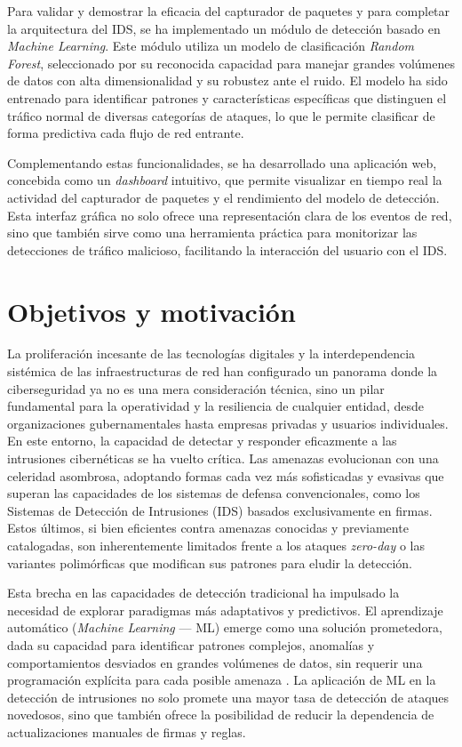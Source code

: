 Para validar y demostrar la eficacia del capturador de paquetes y para completar la arquitectura del IDS, se ha implementado un módulo de detección basado en \textit{Machine Learning}. Este módulo utiliza un modelo de clasificación \textit{Random Forest}, seleccionado por su reconocida capacidad para manejar grandes volúmenes de datos con alta dimensionalidad y su robustez ante el ruido. El modelo ha sido entrenado para identificar patrones y características específicas que distinguen el tráfico normal de diversas categorías de ataques, lo que le permite clasificar de forma predictiva cada flujo de red entrante.

Complementando estas funcionalidades, se ha desarrollado una aplicación web, concebida como un \textit{dashboard} intuitivo, que permite visualizar en tiempo real la actividad del capturador de paquetes y el rendimiento del modelo de detección. Esta interfaz gráfica no solo ofrece una representación clara de los eventos de red, sino que también sirve como una herramienta práctica para monitorizar las detecciones de tráfico malicioso, facilitando la interacción del usuario con el IDS.

\section{Objetivos y motivación}\label{sec:objetivos}

La proliferación incesante de las tecnologías digitales y la interdependencia sistémica de las infraestructuras de red han configurado un panorama donde la ciberseguridad ya no es una mera consideración técnica, sino un pilar fundamental para la operatividad y la resiliencia de cualquier entidad, desde organizaciones gubernamentales hasta empresas privadas y usuarios individuales. En este entorno, la capacidad de detectar y responder eficazmente a las intrusiones cibernéticas se ha vuelto crítica. Las amenazas evolucionan con una celeridad asombrosa, adoptando formas cada vez más sofisticadas y evasivas que superan las capacidades de los sistemas de defensa convencionales, como los Sistemas de Detección de Intrusiones (IDS) basados exclusivamente en firmas. Estos últimos, si bien eficientes contra amenazas conocidas y previamente catalogadas, son inherentemente limitados frente a los ataques \textit{zero-day} o las variantes polimórficas que modifican sus patrones para eludir la detección.

Esta brecha en las capacidades de detección tradicional ha impulsado la necesidad de explorar paradigmas más adaptativos y predictivos. El aprendizaje automático (\textit{Machine Learning} — ML) emerge como una solución prometedora, dada su capacidad para identificar patrones complejos, anomalías y comportamientos desviados en grandes volúmenes de datos, sin requerir una programación explícita para cada posible amenaza \cite{Zhang2022AICybersecurity}. La aplicación de ML en la detección de intrusiones no solo promete una mayor tasa de detección de ataques novedosos, sino que también ofrece la posibilidad de reducir la dependencia de actualizaciones manuales de firmas y reglas.

